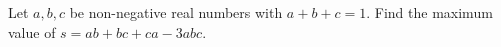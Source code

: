 Let $a,b,c$ be non-negative real numbers with $a+b+c=1$. Find the maximum value of $s=ab+bc+ca-3abc$.
